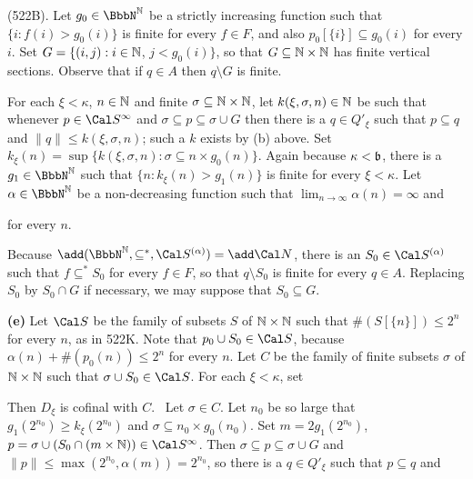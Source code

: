 {

\noindent (522B).   Let $g_0\in\NN$ be a strictly increasing function
such that $\{i:f(i)>g_0(i)\}$ is finite for every $f\in F$, and also
$p_0[\{i\}]\subseteq g_0(i)$ for every $i$.   Set
$G=\{(i,j):i\in\Bbb N$, $j<g_0(i)\}$, so that
$G\subseteq\Bbb N\times\Bbb N$ has finite vertical sections.
Observe that if $q\in A$ then $q\setminus G$ is finite.

For each $\xi<\kappa$, $n\in\Bbb N$ and finite
$\sigma\subseteq\Bbb N\times\Bbb N$, let $k(\xi,\sigma,n)\in\Bbb N$ be
such that whenever $p\in\Cal S^{\infty}$ and
$\sigma\subseteq p\subseteq\sigma\cup G$
then there is a $q\in Q'_{\xi}$ such that $p\subseteq q$ and
$\|q\|\le k(\xi,\sigma,n)$;  such a $k$ exists by (b) above.   Set
$k_{\xi}(n)=\sup\{k(\xi,\sigma,n):\sigma\subseteq n\times g_0(n)\}$.
Again because $\kappa<\frak b$, there is a $g_1\in\NN$ such that
$\{n:k_{\xi}(n)>g_1(n)\}$ is finite for every $\xi<\kappa$.   Let
$\alpha\in\NN$ be a non-decreasing function
such that $\lim_{n\to\infty}\alpha(n)=\infty$ and


\noindent for every $n$.

Because $\add(\NN,\subseteq^*,\Cal S^{(\alpha)})=\add\Cal N$, there is an
$S_0\in\Cal S^{(\alpha)}$ such that $f\subseteq^*S_0$
for every $f\in F$, so that $q\setminus S_0$ is finite for every
$q\in A$.   Replacing $S_0$ by $S_0\cap G$ if necessary, we may suppose
that $S_0\subseteq G$.

\medskip

{\bf (e)} Let $\Cal S$ be the family of subsets $S$ of $\Bbb N\times\Bbb N$
such that $\#(S[\{n\}])\le 2^n$ for every $n$, as in 522K.
Note that $p_0\cup S_0\in\Cal S$,
because $\alpha(n)+\#(p_0(n))\le 2^n$ for every $n$.
Let $C$ be the family of finite subsets $\sigma$ of
$\Bbb N\times\Bbb N$ such that $\sigma\cup S_0\in\Cal S$.
For each $\xi<\kappa$, set


\noindent Then $D_{\xi}$ is cofinal with $C$.   \Prf\ Let $\sigma\in C$.
Let $n_0$ be so large that $g_1(2^{n_0})\ge k_{\xi}(2^{n_0})$ and
$\sigma\subseteq n_0\times g_0(n_0)$.   Set $m=2g_1(2^{n_0})$,
$p=\sigma\cup(S_0\cap(m\times\Bbb N))\in\Cal S^{\infty}$.   Then
$\sigma\subseteq p\subseteq\sigma\cup G$ and
$\|p\|\le\max(2^{n_0},\alpha(m))=2^{n_0}$, so there is a $q\in Q'_{\xi}$
such that $p\subseteq q$ and

}
